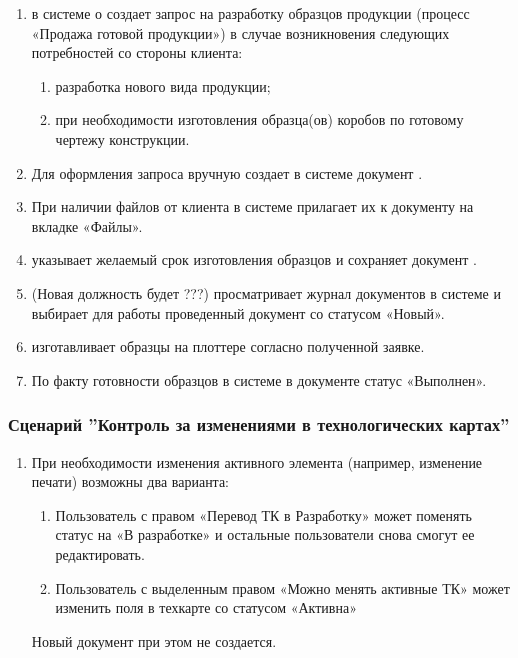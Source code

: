 \begin{enumerate}
\item \manager  в системе  \gofro о создает запрос на разработку образцов продукции (процесс «Продажа готовой продукции») в случае возникновения следующих потребностей со стороны клиента:

\begin{enumerate}
\item 	разработка нового вида продукции;
\item  при необходимости изготовления образца(ов) коробов по готовому чертежу конструкции.


\end{enumerate}
\item	Для оформления запроса \manager вручную создает  в системе  \gofro документ  .
\item	При наличии файлов от клиента \manager в системе \gofro прилагает их к документу  на вкладке «Файлы».
\item	\manager указывает желаемый срок изготовления образцов и сохраняет документ .
\item	\tehnolog (Новая должность будет ???) просматривает журнал документов   в системе  \gofro и выбирает для работы проведенный документ со статусом «Новый».
\item	\tehnolog изготавливает образцы на плоттере согласно полученной заявке.
\item	По факту готовности образцов \tehnolog в системе  в документе  статус «Выполнен».

\end{enumerate}



\subsubsection{Сценарий ''Контроль за изменениями в технологических картах''}
\label{bp:pm_4}


\begin{enumerate}

\item	При необходимости изменения активного элемента   (например, изменение печати) возможны два варианта:

\begin{enumerate}
\item	Пользователь с правом «Перевод ТК в Разработку» может поменять статус  на «В разработке» и остальные пользователи снова смогут ее редактировать.
\item	Пользователь с выделенным правом «Можно менять активные ТК» может изменить поля в техкарте со статусом «Активна»
\end{enumerate}
Новый документ  при этом не создается.
\end{enumerate}



